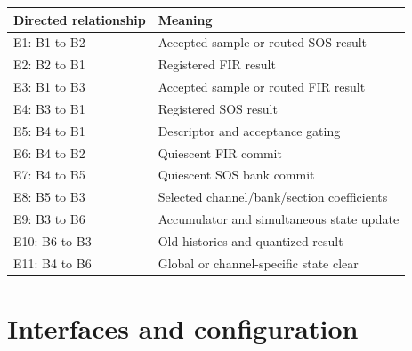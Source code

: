 \documentclass[11pt,a4paper]{article}
\begin{document}
{\small\renewcommand{\arraystretch}{1.18}\begin{longtable}{@{}L{0.24\textwidth}|L{0.7\textwidth}@{}}\toprule

\textbf{Directed relationship} & \textbf{Meaning}\\\midrule\endhead

E1: B1 to B2 & Accepted sample or routed SOS result\\[2pt]\hline

E2: B2 to B1 & Registered FIR result\\[2pt]\hline

E3: B1 to B3 & Accepted sample or routed FIR result\\[2pt]\hline

E4: B3 to B1 & Registered SOS result\\[2pt]\hline

E5: B4 to B1 & Descriptor and acceptance gating\\[2pt]\hline

E6: B4 to B2 & Quiescent FIR commit\\[2pt]\hline

E7: B4 to B5 & Quiescent SOS bank commit\\[2pt]\hline

E8: B5 to B3 & Selected channel/\allowbreak{}bank/\allowbreak{}section coefficients\\[2pt]\hline

E9: B3 to B6 & Accumulator and simultaneous state update\\[2pt]\hline

E10: B6 to B3 & Old histories and quantized result\\[2pt]\hline

E11: B4 to B6 & Global or channel-specific state clear\\[2pt]\hline

\bottomrule\end{longtable}}

\section{Interfaces and configuration}
\end{document}
